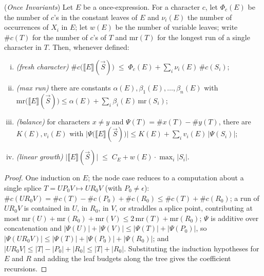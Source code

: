 \documentclass[runningheads,envcountsect]{llncs}
\begin{document}
\begin{theorem}
    (\emph{Once Invariants})
    \label{thm:once-invariants}
    Let $E$ be a once-expression. For a character $c$, let $\Phi_c(E)$ be the number of $c$'s in the constant leaves of $E$ and $\nu_i(E)$ the number of occurrences of $X_i$ in $E$; let $w(E)$ be the number of variable leaves; write $\#c(T)$ for the number of $c$'s of $T$ and $\mathrm{mr}(T)$ for the longest run of a single character in $T$. Then, whenever defined:
    \begin{enumerate}[(i)]
        \item \emph{(fresh character)} $\#c\big(\llbracket E \rrbracket(\vec S)\big) \;\leq\; \Phi_c(E) + \sum_i \nu_i(E)\,\#c(S_i)$;
        \item \emph{(max run)} there are constants $\alpha(E), \beta_1(E), \dots, \beta_n(E)$ with
        $\mathrm{mr}\big(\llbracket E \rrbracket(\vec S)\big) \leq \alpha(E) + \sum_i \beta_i(E)\,\mathrm{mr}(S_i)$;
        \item \emph{(balance)} for characters $x \neq y$ and $\Psi(T) = \#x(T) - \#y(T)$, there are $K(E), v_i(E)$ with $\big|\Psi\big(\llbracket E \rrbracket(\vec S)\big)\big| \leq K(E) + \sum_i v_i(E)\,\big|\Psi(S_i)\big|$;
        \item \emph{(linear growth)} $\big|\llbracket E \rrbracket(\vec S)\big| \;\leq\; C_E + w(E)\cdot \max_i |S_i|$.
    \end{enumerate}
\end{theorem}

\begin{proof}
    One induction on $E$; the node case reduces to a computation about a single splice $T = U P_0 V \mapsto U R_0 V$ (with $P_0 \neq \epsilon$):
    $\#c(UR_0V) = \#c(T) - \#c(P_0) + \#c(R_0) \leq \#c(T) + \#c(R_0)$;
    a run of $UR_0V$ is contained in $U$, in $R_0$, in $V$, or straddles a splice point, contributing at most $\mathrm{mr}(U) + \mathrm{mr}(R_0) + \mathrm{mr}(V) \leq 2\,\mathrm{mr}(T) + \mathrm{mr}(R_0)$;
    $\Psi$ is additive over concatenation and $|\Psi(U)| + |\Psi(V)| \leq |\Psi(T)| + |\Psi(P_0)|$, so $|\Psi(UR_0V)| \leq |\Psi(T)| + |\Psi(P_0)| + |\Psi(R_0)|$;
    and $|UR_0V| \leq |T| - |P_0| + |R_0| \leq |T| + |R_0|$.
    Substituting the induction hypotheses for $E$ and $R$ and adding the leaf budgets along the tree gives the coefficient recursions.
\end{proof}
\end{document}
